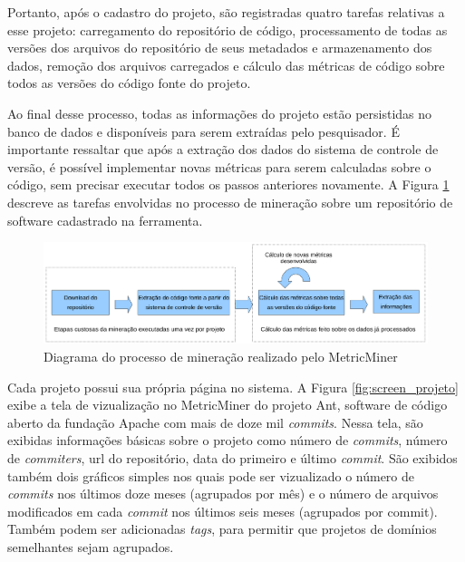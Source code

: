 \documentclass[a4paper, 12pt, twoside]{book}
\begin{document}
        Portanto, após o cadastro do projeto, são registradas quatro tarefas relativas a esse 
        projeto: carregamento do repositório de código, processamento de todas as versões
        dos arquivos do repositório de seus metadados e armazenamento dos dados,
        remoção dos arquivos carregados e cálculo das métricas de código sobre todos
        as versões do código fonte do projeto.

        Ao final desse processo, todas as informações do projeto estão persistidas no banco de dados 
        e disponíveis para serem extraídas pelo pesquisador. É importante ressaltar que após a 
        extração dos dados do sistema de controle de versão, é possível implementar novas métricas 
        para serem calculadas sobre o código, sem precisar executar todos os passos anteriores 
        novamente. A Figura \ref{fig:diagrama} descreve as tarefas envolvidas no processo de 
        mineração sobre um repositório de software cadastrado na ferramenta.

        \begin{figure}[ht]
            \centering
            \includegraphics[width=1.0\textwidth]{img/diagrama.png}
            \caption{Diagrama do processo de mineração realizado pelo MetricMiner}
            \label{fig:diagrama}
        \end{figure}

        Cada projeto possui sua própria página no sistema. A Figura \ref{fig:screen_projeto} exibe a 
        tela de vizualização no MetricMiner do projeto Ant, software de código aberto da fundação     
        Apache com mais de doze mil \textit{commits}. Nessa tela, são exibidas informações básicas 
        sobre o projeto como número de \textit{commits}, número de \textit{commiters}, url do 
        repositório, data do primeiro e último \textit{commit}. São exibidos também dois gráficos 
        simples nos quais pode ser vizualizado o número de \textit{commits} nos últimos doze meses 
        (agrupados por mês) e o número de arquivos modificados em cada \textit{commit} nos últimos 
        seis meses (agrupados por commit). Também podem ser adicionadas \textit{tags},
        para permitir que projetos de domínios semelhantes sejam agrupados.
    
\end{document}

